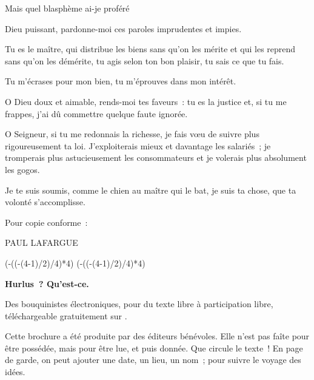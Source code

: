 \documentclass[french,twoside]{book} %
\def\truncdiv#1#2{((#1-(#2-1)/2)/#2)}
\def\moduloop#1#2{(#1-\truncdiv{#1}{#2}*#2)}
\def\modulo#1#2{\number\numexpr\moduloop{#1}{#2}\relax}
\begin{document}
Mais quel blasphème ai-je proféré\par
Dieu puissant, pardonne-moi ces paroles imprudentes et impies.\par
Tu es le maître, qui distribue les biens sans qu’on les mérite et qui les reprend sans qu’on les démérite, tu agis selon ton bon plaisir, tu sais ce que tu fais.\par
Tu m’écrases pour mon bien, tu m’éprouves dans mon intérêt.\par
O Dieu doux et aimable, rends-moi tes faveurs : tu es la justice et, si tu me frappes, j’ai dû commettre quelque faute ignorée.\par
O Seigneur, si tu me redonnais la richesse, je fais vœu de suivre plus rigoureusement ta loi. J'exploiterais mieux et davantage les salariés ; je tromperais plus astucieusement les consommateurs et je volerais plus absolument les gogos.\par
Je te suis soumis, comme le chien au maître qui le bat, je suis ta chose, que ta volonté s’accomplisse.\par

\begin{center}
\noindent Pour copie conforme :\par
\end{center}


\begin{center}
\noindent \centerline{PAUL LAFARGUE}
\end{center}

 


\ifbooklet
  \pagestyle{empty}
  \clearpage
  \ifnum\modulo{\value{page}}{4}=0 \hbox{}\newpage\hbox{}\newpage\fi
  \ifnum\modulo{\value{page}}{4}=1 \hbox{}\newpage\hbox{}\newpage\fi


  \hbox{}\newpage
  \ifodd\value{page}\hbox{}\newpage\fi
  {\centering\color{rubric}\bfseries\noindent\large
    Hurlus ? Qu’est-ce.\par
    \bigskip
  }
  \noindent Des bouquinistes électroniques, pour du texte libre à participation libre,
  téléchargeable gratuitement sur \href{https://hurlus.fr}{}.\par
  \bigskip
  \noindent Cette brochure a été produite par des éditeurs bénévoles.
  Elle n’est pas faîte pour être possédée, mais pour être lue, et puis donnée.
  Que circule le texte !
  En page de garde, on peut ajouter une date, un lieu, un nom ; pour suivre le voyage des idées.
  \par
\end{document}
